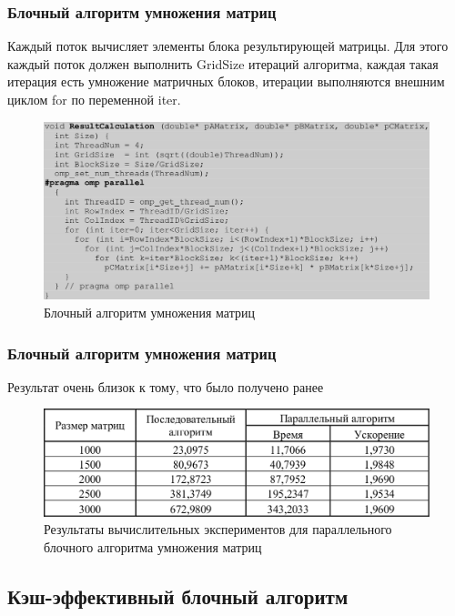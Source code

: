 \documentclass{beamer}
\begin{document}
\begin{frame}
\frametitle{Блочный алгоритм умножения матриц}
Каждый поток вычисляет элементы блока результирующей матрицы. Для этого каждый поток должен выполнить GridSize итераций алгоритма, каждая такая итерация есть умножение матричных блоков, итерации выполняются внешним циклом for по переменной iter.

\begin{figure}
\includegraphics[scale=0.25]{res/pic013}
\caption{Блочный алгоритм умножения матриц}
\end{figure}

\end{frame}


\begin{frame}
\frametitle{Блочный алгоритм умножения матриц}

Результат очень близок к тому, что было получено ранее

\begin{figure}
\includegraphics[scale=0.25]{res/pic014}
\caption{Результаты вычислительных экспериментов для параллельного блочного алгоритма умножения матриц}
\end{figure}

\end{frame}

\subsection{Кэш-эффективный блочный алгоритм}
\end{document}
